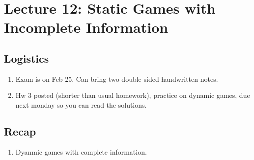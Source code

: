 \section{Lecture 12: Static Games with Incomplete Information}
\newsection
\subsection*{Logistics}
\begin{enumerate}
    \item Exam is on Feb 25. Can bring two double sided handwritten notes. 
    \item Hw 3 posted (shorter than usual homework), practice on dynamic games, due next monday so you can read the solutions.
\end{enumerate}


\subsection*{Recap}
\begin{enumerate}
    \item Dyanmic games with complete information.
\end{enumerate}

